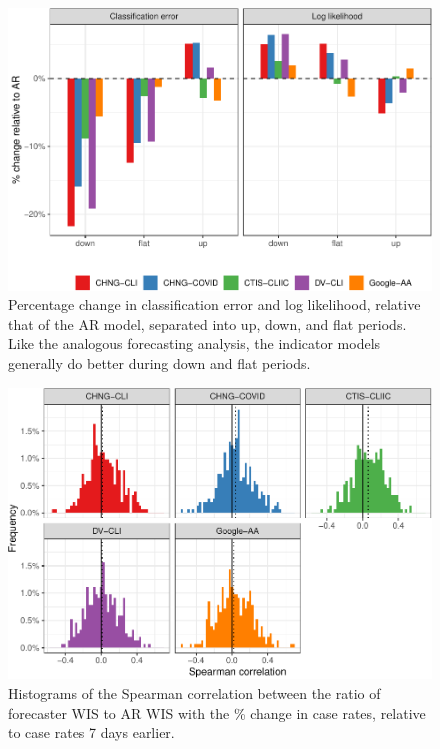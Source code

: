 \documentclass[9pt,twoside,lineno]{pnas-new}
\begin{document}
\clearpage

\begin{figure}

{\centering \includegraphics[width=\textwidth]{fig/hotspots-upswing-downswing-1} 

}

\caption{Percentage change in classification error and log likelihood, relative that of the AR model, separated into up, down, and flat periods. Like the analogous forecasting analysis, the indicator models generally do better during down and flat periods.}\label{fig:hotspots-upswing-downswing}
\end{figure}

\begin{figure}

{\centering \includegraphics[width=\textwidth]{fig/cor-wis-ratio-1} 

}

\caption{Histograms of the Spearman correlation between the ratio of forecaster WIS to AR WIS with the \% change in case rates, relative to case rates 7 days earlier.}\label{fig:cor-wis-ratio}
\end{figure}
\end{document}
